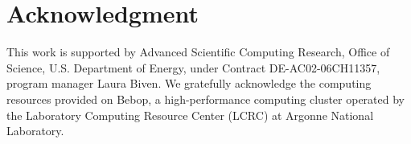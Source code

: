 \documentclass[conference]{IEEEtran}
\begin{document}
\section*{Acknowledgment}

This work is supported by Advanced Scientific Computing Research, Office of Science, U.S. Department of Energy, under
Contract DE-AC02-06CH11357, program manager Laura Biven. We gratefully acknowledge the computing resources provided on
Bebop, a high-performance computing cluster operated by the Laboratory Computing Resource Center (LCRC) at Argonne
National Laboratory.




\end{document}
